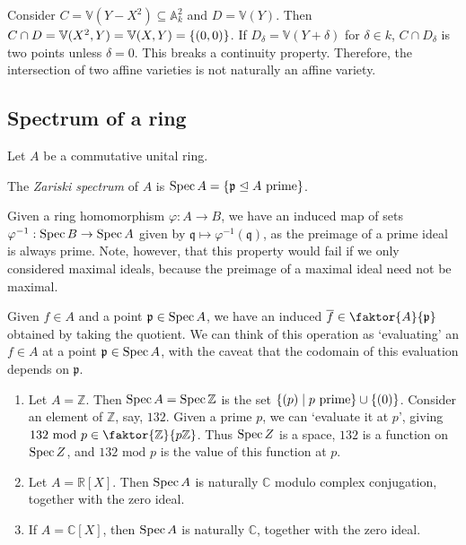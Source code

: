 Consider \( C = \mathbb V(Y - X^2) \subseteq \mathbb A^2_k \) and \( D = \mathbb V(Y) \).
Then \( C \cap D = \mathbb V(X^2, Y) = \mathbb V(X, Y) = \qty{(0, 0)} \).
If \( D_\delta = \mathbb V(Y + \delta) \) for \( \delta \in k \), \( C \cap D_\delta \) is two points unless \( \delta = 0 \).
This breaks a continuity property.
Therefore, the intersection of two affine varieties is not naturally an affine variety.

\subsection{Spectrum of a ring}
Let \( A \) be a commutative unital ring.
\begin{definition}
    The \emph{Zariski spectrum} of \( A \) is \( \operatorname{Spec} A = \qty{\mathfrak p \trianglelefteq A \text{ prime}} \).
\end{definition}
\begin{remark}
    Given a ring homomorphism \( \varphi : A \to B \), we have an induced map of sets \( \varphi^{-1} : \operatorname{Spec} B \to \operatorname{Spec} A \) given by \( \mathfrak q \mapsto \varphi^{-1}(\mathfrak q) \), as the preimage of a prime ideal is always prime.
    Note, however, that this property would fail if we only considered maximal ideals, because the preimage of a maximal ideal need not be maximal.

    Given \( f \in A \) and a point \( \mathfrak p \in \operatorname{Spec} A \), we have an induced \( \overline f \in \faktor{A}{\mathfrak p} \) obtained by taking the quotient.
    We can think of this operation as `evaluating' an \( f \in A \) at a point \( \mathfrak p \in \operatorname{Spec} A \), with the caveat that the codomain of this evaluation depends on \( \mathfrak p \).
\end{remark}
\begin{example}
    \begin{enumerate}
        \item Let \( A = \mathbb Z \).
        Then \( \operatorname{Spec} A = \operatorname{Spec} \mathbb Z \) is the set \( \qty{(p) \mid p \text{ prime}} \cup \qty{(0)} \).
        Consider an element of \( \mathbb Z \), say, \( 132 \).
        Given a prime \( p \), we can `evaluate it at \( p \)', giving \( 132 \text{ mod } p \in \faktor{\mathbb Z}{p\mathbb Z} \).
        Thus \( \operatorname{Spec} Z \) is a space, \( 132 \) is a function on \( \operatorname{Spec} Z \), and \( 132 \text{ mod } p \) is the value of this function at \( p \).
        \item Let \( A = \mathbb R[X] \).
        Then \( \operatorname{Spec} A \) is naturally \( \mathbb C \) modulo complex conjugation, together with the zero ideal.
        \item If \( A = \mathbb C[X] \), then \( \operatorname{Spec} A \) is naturally \( \mathbb C \), together with the zero ideal.
    \end{enumerate}
\end{example}

